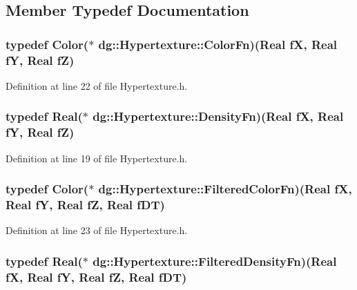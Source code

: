 \subsection{Member Typedef Documentation}
\subsubsection{\setlength{\rightskip}{0pt plus 5cm}typedef {\bf Color}($\ast$ dg::Hypertexture::Color\-Fn)({\bf Real} f\-X, {\bf Real} f\-Y, {\bf Real} f\-Z)}\label{classdg_1_1Hypertexture_s2}




Definition at line 22 of file Hypertexture.h.
\subsubsection{\setlength{\rightskip}{0pt plus 5cm}typedef {\bf Real}($\ast$ dg::Hypertexture::Density\-Fn)({\bf Real} f\-X, {\bf Real} f\-Y, {\bf Real} f\-Z)}\label{classdg_1_1Hypertexture_s0}




Definition at line 19 of file Hypertexture.h.
\subsubsection{\setlength{\rightskip}{0pt plus 5cm}typedef {\bf Color}($\ast$ dg::Hypertexture::Filtered\-Color\-Fn)({\bf Real} f\-X, {\bf Real} f\-Y, {\bf Real} f\-Z, {\bf Real} f\-DT)}\label{classdg_1_1Hypertexture_s3}




Definition at line 23 of file Hypertexture.h.
\subsubsection{\setlength{\rightskip}{0pt plus 5cm}typedef {\bf Real}($\ast$ dg::Hypertexture::Filtered\-Density\-Fn)({\bf Real} f\-X, {\bf Real} f\-Y, {\bf Real} f\-Z, {\bf Real} f\-DT)}\label{classdg_1_1Hypertexture_s1}




